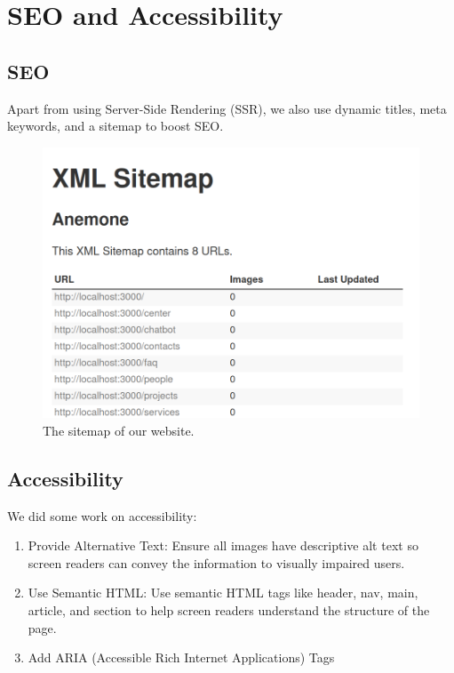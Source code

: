 
\section{SEO and Accessibility}
\subsection{SEO}
Apart from using Server-Side Rendering (SSR), we also use dynamic titles, meta keywords, and a sitemap to boost SEO.
\begin{figure}[h]
	\centering
	\includegraphics[width=\linewidth]{Resources/sitemap.png}
	\caption{The sitemap of our website.}
	\label{fig:example}
\end{figure}
\subsection{Accessibility}
We did some work on accessibility:

\begin{enumerate}
	\item Provide Alternative Text: Ensure all images have descriptive alt text so screen readers can convey the information to visually impaired users.
	\item Use Semantic HTML: Use semantic HTML tags like header, nav, main, article, and section to help screen readers understand the structure of the page.
	\item Add ARIA (Accessible Rich Internet Applications) Tags
\end{enumerate}





